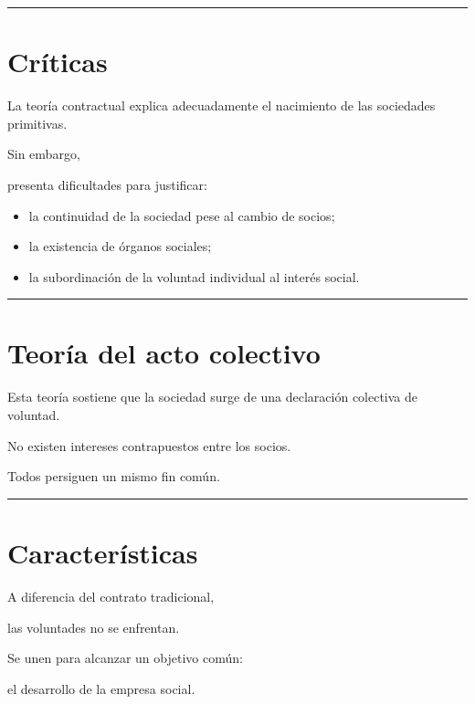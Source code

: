 \documentclass[
  spanish,
  letterpaper,
  DIV=11,
  numbers=noendperiod]{scrartcl}
\providecommand{\tightlist}{%
  \setlength{\itemsep}{0pt}\setlength{\parskip}{0pt}}
\begin{document}
\begin{center}\rule{0.5\linewidth}{0.5pt}\end{center}

\section{Críticas}\label{cruxedticas}

La teoría contractual explica adecuadamente el nacimiento de las
sociedades primitivas.

Sin embargo,

presenta dificultades para justificar:

\begin{itemize}
\tightlist
\item
  la continuidad de la sociedad pese al cambio de socios;
\item
  la existencia de órganos sociales;
\item
  la subordinación de la voluntad individual al interés social.
\end{itemize}

\begin{center}\rule{0.5\linewidth}{0.5pt}\end{center}

\section{Teoría del acto colectivo}\label{teoruxeda-del-acto-colectivo}

Esta teoría sostiene que la sociedad surge de una declaración colectiva
de voluntad.

No existen intereses contrapuestos entre los socios.

Todos persiguen un mismo fin común.

\begin{center}\rule{0.5\linewidth}{0.5pt}\end{center}

\section{Características}\label{caracteruxedsticas}

A diferencia del contrato tradicional,

las voluntades no se enfrentan.

Se unen para alcanzar un objetivo común:

el desarrollo de la empresa social.
\end{document}
